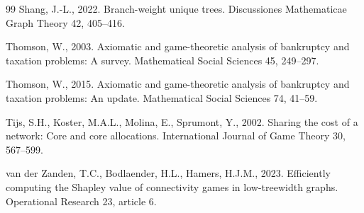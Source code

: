 \documentclass[preprint,12pt,authoryear]{elsarticle}
\begin{document}
\begin{thebibliography}{99}
Shang, J.-L., 2022.
Branch-weight unique trees. Discussiones Mathematicae Graph Theory 42,
405--416.


Thomson, W., 2003.
Axiomatic and game-theoretic analysis of bankruptcy and taxation problems: A
survey. Mathematical Social Sciences 45, 249--297.

Thomson, W., 2015.
Axiomatic and game-theoretic analysis of bankruptcy and taxation problems: An
update. Mathematical Social Sciences 74, 41--59.

Tijs, S.H., Koster, M.A.L., Molina, E., Sprumont, Y., 2002.
Sharing the cost of a network: Core and core allocations.
International Journal of Game Theory 30, 567--599.

van der Zanden, T.C., Bodlaender, H.L., Hamers, H.J.M., 2023.
Efficiently computing the Shapley value of connectivity games in low-treewidth
graphs. Operational Research 23, article 6.

\end{thebibliography}
\endgroup
\end{document}
